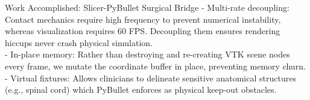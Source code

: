 \documentclass{if-beamer}
\begin{document}
\begin{frame}{Work Accomplished: Slicer-PyBullet Surgical Bridge}
{        - Multi-rate decoupling: Contact mechanics require high frequency to prevent numerical instability, whereas visualization requires 60 FPS. Decoupling them ensures rendering hiccups never crash physical simulation.\\
        - In-place memory: Rather than destroying and re-creating VTK scene nodes every frame, we mutate the coordinate buffer in place, preventing memory churn.\\
        - Virtual fixtures: Allows clinicians to delineate sensitive anatomical structures (e.g., spinal cord) which PyBullet enforces as physical keep-out obstacles.
    }
\end{frame}

\end{document}
